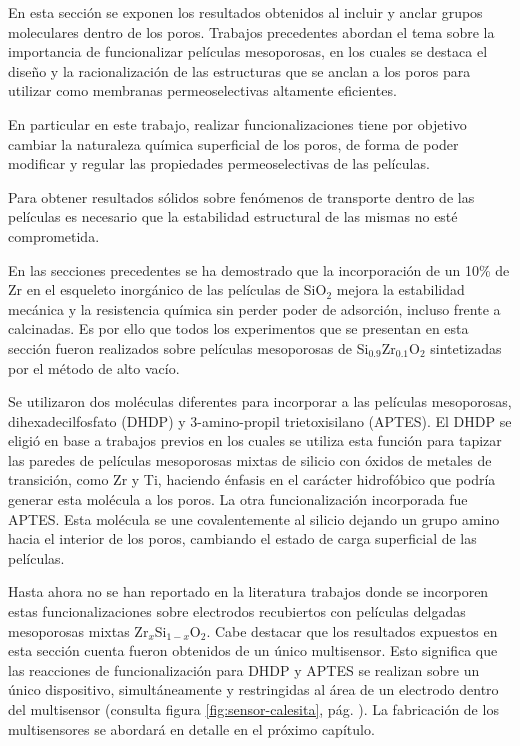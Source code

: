 			En esta sección se exponen los resultados obtenidos al incluir y anclar grupos moleculares dentro de los poros. Trabajos precedentes abordan el tema sobre la importancia de funcionalizar películas mesoporosas, en los cuales se destaca el diseño y la racionalización de las estructuras que se anclan a los poros para utilizar como membranas permeoselectivas altamente eficientes.\cite{Otal2006,Calvo2008,alberti2015,Calvo20210,Dunphy2004} 

			En particular en este trabajo, realizar funcionalizaciones tiene por objetivo cambiar la naturaleza química superficial de los poros, de forma de poder modificar y regular las propiedades permeoselectivas de las películas. 

			Para obtener resultados sólidos sobre fenómenos de transporte dentro de las películas es necesario que la estabilidad estructural de las mismas no esté comprometida. 

			En las secciones precedentes se ha demostrado que la incorporación de un 10\% de Zr en el esqueleto inorgánico de las películas de SiO$_2$ mejora la estabilidad mecánica y la resistencia química sin perder poder de adsorción, incluso frente a \pdmF\space calcinadas. Es por ello que todos los experimentos que se presentan en esta sección fueron realizados sobre películas mesoporosas de  Si$_{0.9}$Zr$_{0.1}$O$_2$ sintetizadas por el método de alto vacío.

			Se utilizaron dos moléculas diferentes para incorporar a las películas mesoporosas, dihexadecilfosfato (DHDP) y 3-amino-propil trietoxisilano (APTES). El DHDP se eligió en base a trabajos previos en los cuales se utiliza esta función para tapizar las paredes de películas mesoporosas mixtas de silicio con óxidos de metales de transición, como Zr y Ti, haciendo énfasis en el carácter hidrofóbico que podría generar esta molécula a los poros.\cite{Angelome2008,Otal2006} La otra funcionalización incorporada fue APTES. Esta molécula se une covalentemente al silicio dejando un grupo amino hacia el interior de los poros, cambiando el estado de carga superficial de las películas. \cite{Calvo2009b,Fattakhova-Rohlfing2007,Andrieu-brunsen2014,Andrieu-Brunsen2015}

		 	Hasta ahora no se han reportado en la literatura trabajos donde se incorporen estas funcionalizaciones sobre electrodos recubiertos con películas delgadas mesoporosas mixtas Zr$_x$Si$_{1-x}$O$_2$. Cabe destacar que los resultados expuestos en esta sección cuenta fueron obtenidos de un único multisensor. Esto significa que las reacciones de funcionalización para DHDP y APTES se realizan sobre un único dispositivo, simultáneamente y restringidas al área de un electrodo dentro del multisensor (consulta figura \ref{fig:sensor-calesita}, pág. \pageref{fig:sensor-calesita}).	La fabricación de los multisensores se abordará en detalle en el próximo capítulo.
	
